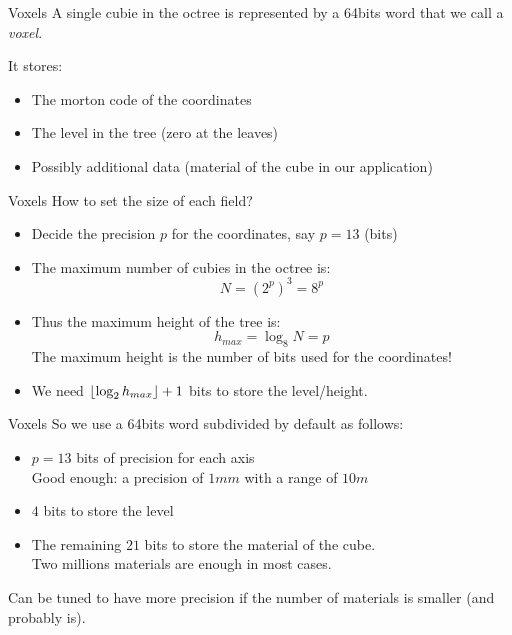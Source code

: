 \documentclass[utf8x]{beamer}
\DeclarePairedDelimiter{\floor}{\lfloor}{\rfloor}
\begin{document}
\begin{frame}{Voxels}
A single cubie in the octree is represented by a 64bits word that we call a 
\emph{voxel}. 

It stores:
\begin{itemize}
\item The morton code of the coordinates
\item The level in the tree (zero at the leaves)
\item Possibly additional data (material of the cube in our application)
\end{itemize}
\end{frame}

\begin{frame}{Voxels}
How to set the size of each field?
\begin{itemize}
\item Decide the precision $p$ for the coordinates, say $p=13$ (bits)
\item The maximum number of cubies in the octree is:
      \begin{equation}
      N=(2^p)^3 = 8^p
      \end{equation}
\item Thus the maximum height of the tree is:
      \begin{equation}
      h_{max} = \log_8 N = p
      \end{equation}
      The maximum height is the number of bits used for the coordinates!
\item We need $\floor{\log_2 h_{max}} + 1$ bits to store the level/height.
\end{itemize}
\end{frame}

\begin{frame}{Voxels}
So we use a 64bits word subdivided by default as follows:
\begin{itemize}
\item $p=13$ bits of precision for each axis \\
      Good enough: a precision of $1mm$ with a range of $10m$
\item $4$ bits to store the level
\item The remaining $21$ bits to store the material of the cube.\\
      Two millions materials are enough in most cases.
\end{itemize}
Can be tuned to have more precision if the number of materials is smaller 
(and probably is).
\end{frame}
\end{document}
